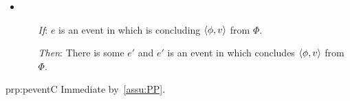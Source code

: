 \begin{note}
  \begin{proposition}
    \label{prp:peventC}

    \begin{itemize}
    \item
      \begin{itemize}
      \item[\emph{If}:]
        \(e\) is an event in which \vAgent{} is concluding \(\langle \phi, v \rangle\) from \(\Phi\).
      \item[\emph{Then}:]
        There is some \pevent{} \(e'\) and \(e'\) is an event in which \vAgent{} concludes \(\langle \phi, v \rangle\) from \(\Phi\).
      \end{itemize}
    \end{itemize}
    \vspace{-\baselineskip}
  \end{proposition}

  \begin{argument}{prp:peventC}
    Immediate by~\autoref{assu:PP}.
  \end{argument}

  \begin{observation}
    \label{obs:cds-arb}


\end{observation}
\end{note}
